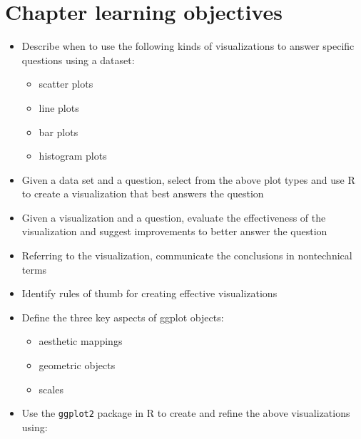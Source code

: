\documentclass[
]{krantz}
\providecommand{\tightlist}{%
  \setlength{\itemsep}{0pt}\setlength{\parskip}{0pt}}
\begin{document}
\hypertarget{chapter-learning-objectives-3}{%
\section{Chapter learning objectives}\label{chapter-learning-objectives-3}}

\begin{itemize}
\tightlist
\item
  Describe when to use the following kinds of visualizations to answer specific questions using a dataset:

  \begin{itemize}
  \tightlist
  \item
    scatter plots
  \item
    line plots
  \item
    bar plots
  \item
    histogram plots
  \end{itemize}
\item
  Given a data set and a question, select from the above plot types and use R to create a visualization that best answers the question
\item
  Given a visualization and a question, evaluate the effectiveness of the visualization and suggest improvements to better answer the question
\item
  Referring to the visualization, communicate the conclusions in nontechnical terms
\item
  Identify rules of thumb for creating effective visualizations
\item
  Define the three key aspects of ggplot objects:

  \begin{itemize}
  \tightlist
  \item
    aesthetic mappings
  \item
    geometric objects
  \item
    scales
  \end{itemize}
\item
  Use the \texttt{ggplot2} package in R to create and refine the above visualizations using:


\end{itemize}
\end{document}
